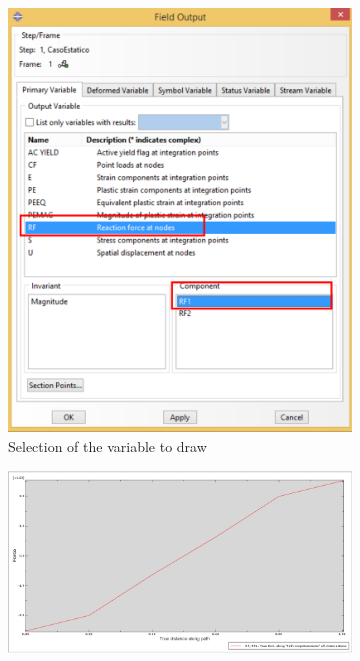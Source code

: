 \begin{enumerate}
\begin{figure}[H]
  \centering
  \begin{varwidth}{0.45\linewidth} %
    \begin{subfigure}{0.95\textwidth}
      \includegraphics[width=\textwidth]{./body/images/imagen107.pdf}
      \caption{Selection of the variable to draw}
      \label{figu107}
    \end{subfigure}
  \end{varwidth}\quad%
  \begin{varwidth}{0.55\linewidth} %
    \begin{subfigure}{0.99\textwidth}
      \includegraphics[width=\textwidth]{./body/images/imagen108}

\end{subfigure}
\end{varwidth}
\end{figure}
\end{enumerate}
